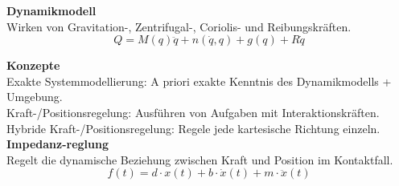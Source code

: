 \textbf{Dynamikmodell}\\
Wirken von Gravitation-, Zentrifugal-, Coriolis- und Reibungskräften.
\[ Q = M(q)\ddot{q} + n(\dot{q}, q) + g(q) + R\dot{q}\]

\textbf{Konzepte}\\
Exakte Systemmodellierung: A priori exakte Kenntnis des Dynamikmodells + Umgebung.\\
Kraft-/Positionsregelung: Ausführen von Aufgaben mit Interaktionskräften.\\
Hybride Kraft-/Positionsregelung: Regele jede kartesische Richtung einzeln.\\

\textbf{Impedanz-reglung}\\
Regelt die dynamische Beziehung zwischen Kraft und Position im Kontaktfall.\\
\[f(t) = d \cdot x(t) + b \cdot \dot{x}(t) + m \cdot \ddot{x}(t)\]